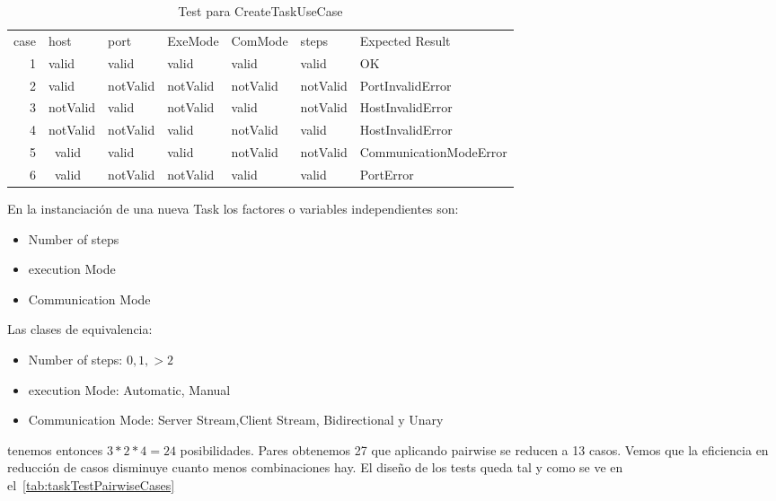 \begin{table}[H]
    \caption{Test para CreateTaskUseCase}\label{tab:createTaskPairWiseTest}
    \small
    \begin{tabular}{rllllll}
        case & host     & port     & ExeMode  & ComMode  & steps    & Expected Result        \\
        1    & valid    & valid    & valid    & valid    & valid    & OK                     \\
        2    & valid    & notValid & notValid & notValid & notValid & PortInvalidError       \\
        3    & notValid & valid    & notValid & valid    & notValid & HostInvalidError       \\
        4    & notValid & notValid & valid    & notValid & valid    & HostInvalidError       \\
        5    & ~valid   & valid    & valid    & notValid & notValid & CommunicationModeError \\
        6    & ~valid   & notValid & notValid & valid    & valid    & PortError
    \end{tabular}
\end{table}

En la instanciación de una nueva Task los factores o variables independientes son:

\begin{itemize}
    \item Number of steps
    \item execution Mode
    \item Communication Mode
\end{itemize}

Las clases de equivalencia:

\begin{itemize}
    \item Number of steps: $0, 1, >2$
    \item execution Mode: Automatic, Manual
    \item Communication Mode: Server Stream,Client Stream, Bidirectional y Unary
\end{itemize}

tenemos entonces  $3*2*4 = 24$ posibilidades.
Pares obtenemos 27 que aplicando pairwise se reducen a 13 casos.
Vemos que la eficiencia en reducción de casos disminuye cuanto menos combinaciones hay.
El diseño de los tests queda tal y como se ve en el~\cref{tab:taskTestPairwiseCases}

